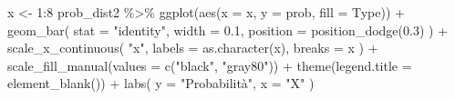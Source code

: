 \documentclass[
]{memoir}
\newenvironment{Shaded}{\begin{snugshade}}{\end{snugshade}}
\newcommand{\AttributeTok}[1]{\textcolor[rgb]{0.77,0.63,0.00}{#1}}
\newcommand{\DecValTok}[1]{\textcolor[rgb]{0.00,0.00,0.81}{#1}}
\newcommand{\FloatTok}[1]{\textcolor[rgb]{0.00,0.00,0.81}{#1}}
\newcommand{\FunctionTok}[1]{\textcolor[rgb]{0.00,0.00,0.00}{#1}}
\newcommand{\NormalTok}[1]{#1}
\newcommand{\OtherTok}[1]{\textcolor[rgb]{0.56,0.35,0.01}{#1}}
\newcommand{\SpecialCharTok}[1]{\textcolor[rgb]{0.00,0.00,0.00}{#1}}
\newcommand{\StringTok}[1]{\textcolor[rgb]{0.31,0.60,0.02}{#1}}
\begin{document}
\begin{Shaded}
\end{Shaded}

\begin{Shaded}
\begin{Highlighting}[]
\NormalTok{x }\OtherTok{\textless{}{-}} \DecValTok{1}\SpecialCharTok{:}\DecValTok{8}
\NormalTok{prob\_dist2 }\SpecialCharTok{\%\textgreater{}\%}
  \FunctionTok{ggplot}\NormalTok{(}\FunctionTok{aes}\NormalTok{(}\AttributeTok{x =}\NormalTok{ x, }\AttributeTok{y =}\NormalTok{ prob, }\AttributeTok{fill =}\NormalTok{ Type)) }\SpecialCharTok{+}
  \FunctionTok{geom\_bar}\NormalTok{(}
    \AttributeTok{stat =} \StringTok{"identity"}\NormalTok{, }
    \AttributeTok{width =} \FloatTok{0.1}\NormalTok{, }
    \AttributeTok{position =} \FunctionTok{position\_dodge}\NormalTok{(}\FloatTok{0.3}\NormalTok{)}
\NormalTok{  ) }\SpecialCharTok{+}
  \FunctionTok{scale\_x\_continuous}\NormalTok{(}
    \StringTok{"x"}\NormalTok{, }
    \AttributeTok{labels =} \FunctionTok{as.character}\NormalTok{(x), }
    \AttributeTok{breaks =}\NormalTok{ x}
\NormalTok{  ) }\SpecialCharTok{+}
  \FunctionTok{scale\_fill\_manual}\NormalTok{(}\AttributeTok{values =} \FunctionTok{c}\NormalTok{(}\StringTok{"black"}\NormalTok{, }\StringTok{"gray80"}\NormalTok{)) }\SpecialCharTok{+}
  \FunctionTok{theme}\NormalTok{(}\AttributeTok{legend.title =} \FunctionTok{element\_blank}\NormalTok{()) }\SpecialCharTok{+}
  \FunctionTok{labs}\NormalTok{(}
    \AttributeTok{y =} \StringTok{"Probabilità"}\NormalTok{,}
    \AttributeTok{x =} \StringTok{"X"}
\NormalTok{  )}
\end{Highlighting}
\end{Shaded}
\end{document}
